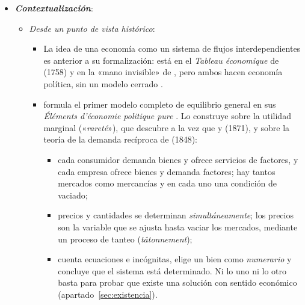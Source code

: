 \documentclass[11pt]{article}
\begin{document}
\begin{itemize}
\item \textbf{\emph{Contextualización}}:
  \begin{itemize}
  \item \emph{Desde un punto de vista histórico}:
  \begin{itemize}
  \item La idea de una economía como un sistema de flujos interdependientes es anterior a su formalización: está en el \emph{Tableau économique} de  (1758) y en la «mano invisible» de \textcite{Smith1776Wealth}, pero ambos hacen economía política, sin un modelo cerrado .
  \item {} formula el primer modelo completo de equilibrio general en sus \emph{Éléments d'économie politique pure}\nocite{Walras1874Elements} . Lo construye sobre la utilidad marginal («\emph{rareté}»), que descubre a la vez que  y  (1871), y sobre la teoría de la demanda recíproca de  (1848):
    \begin{itemize}
    \item cada consumidor demanda bienes y ofrece servicios de factores, y cada empresa ofrece bienes y demanda factores; hay tantos mercados como mercancías y en cada uno una condición de vaciado;
    \item precios y cantidades se determinan \emph{simultáneamente}; los precios son la variable que se ajusta hasta vaciar los mercados, mediante un proceso de tanteo (\emph{tâtonnement});
    \item {} cuenta ecuaciones e incógnitas, elige un bien como \emph{numerario} y concluye que el sistema está determinado. Ni lo uno ni lo otro basta para probar que existe una solución con sentido económico (apartado~\ref{sec:existencia}).
    \end{itemize}

\end{itemize}
\end{itemize}
\end{itemize}
\end{document}
